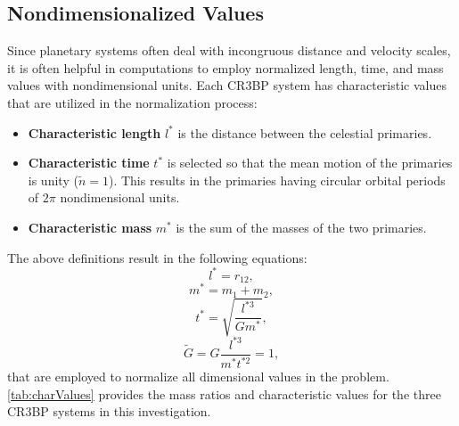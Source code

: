 \subsection{Nondimensionalized Values}
Since planetary systems often deal with incongruous distance and velocity scales, it is often
helpful in computations to employ normalized length, time, and mass values with nondimensional
units. Each CR3BP system has characteristic values that are utilized in the normalization process:
\begin{itemize}
    \item \textbf{Characteristic length} $l^{*}$ is the distance between the celestial primaries.
    \item \textbf{Characteristic time} $t^{*}$ is selected so that the mean motion of the primaries
    is unity ($\tilde{n}=1$). This results in the primaries having circular orbital periods of
    $2\pi$ nondimensional units.
    \item \textbf{Characteristic mass} $m^{*}$ is the sum of the masses of the two primaries.
\end{itemize}
The above definitions result in the following equations:
\begin{equation}
    l^{*}=r_{12},
    \label{eq:lstar}
\end{equation}
\begin{equation}
    m^{*}=m_{1}+m_{2},
    \label{eq:mstar}
\end{equation}
\vspace{1mm}
\begin{equation}
    t^{*}=\sqrt{\frac{l^{*3}}{Gm^{*}}},
    \label{eq:tstar}
\end{equation}
\vspace{1mm}
\begin{equation}
    \tilde{G}=G\frac{l^{*3}}{m^{*}t^{*2}}=1,
    \label{eq:gstar}
\end{equation}
that are employed to normalize all dimensional values in the problem. \cref{tab:charValues}
provides the mass ratios and characteristic values for the three CR3BP systems in this
investigation.

